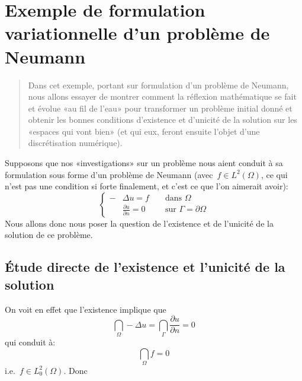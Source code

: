 \chapter{Exemple de formulation variationnelle d'un problème de Neumann}
\begin{abstract}
Dans cet exemple, portant sur formulation d'un problème de Neumann,
nous allons essayer de montrer comment la réflexion mathématique se
fait et évolue «au fil de l'eau» pour transformer un problème initial donné et obtenir
les bonnes conditions d'existence et d'unicité de la solution sur les «espaces qui vont
bien» (et qui eux, feront ensuite l'objet d'une discrétisation numérique).
\end{abstract}

Supposons que nos «investigations» sur un problème nous aient
conduit à sa formulation sous forme d'un problème de Neumann
(avec~$f\in L^2(\Omega)$, ce qui n'est pas une condition si forte finalement, et c'est ce que l'on aimerait avoir):
\begin{equation}\left\{
\begin{aligned}
-&\Delta u = f && \text{ dans } \Omega\\
&\frac{\partial u}{\partial n}=0 && \text{ sur }\Gamma=\partial\Omega
\end{aligned}
\right.
\end{equation}
Nous allons donc nous poser la question de l'existence et de l'unicité de la solution de ce problème.

\medskip
\section{Étude directe de l'existence et l'unicité de la solution}

On voit en effet que l'existence implique que
\begin{equation}\dint_\Omega -\Delta u = \dint_\Gamma \frac{\partial u}{\partial n}=0\end{equation}
qui conduit à:\begin{equation}\dint_\Omega f =0\end{equation} i.e.~$f\in L^2_0(\Omega)$.
Donc 

